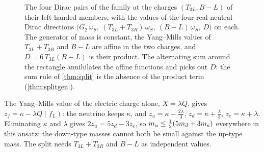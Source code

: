 \begin{figure}[t]
\centering
{}
\caption{The four Dirac pairs of the family at the charges $(T_{3L},B\!-\!L)$ of their left-handed members, with the values of the four real
neutral Dirac directions $\bigl(G_2\,\omega_S,\ (T_{3L}+T_{3R})\,\omega_S,\ (B\!-\!L)\,\omega_S,\ D\bigr)$ on each. The generator of mass is
constant, the Yang--Mills values of $T_{3L}+T_{3R}$ and $B\!-\!L$ are affine in the two charges, and $D=6\,T_{3L}(B\!-\!L)$ is their product.
The alternating sum around the rectangle annihilates the affine functions and picks out $D$: the sum rule of \cref{thm:split} is the absence
of the product term (\cref{thm:splitgen}).}
\label{fig:diracpairs}
\end{figure}

\begin{remark}
The Yang--Mills value of the electric charge alone, $X=\lambda Q$, gives $z_f=\kappa-\lambda Q(f_L)$: the neutrino keeps $\kappa$, and
$z_u=\kappa-\tfrac{2\lambda}3$, $z_d=\kappa+\tfrac\lambda3$, $z_e=\kappa+\lambda$. Eliminating $\kappa$ and $\lambda$ gives
$2z_u=5z_d-3z_e$, so $m_u\le\tfrac12(5m_d+3m_e)$ everywhere in this ansatz: the down-type masses cannot both be small against the up-type mass.
The split needs $T_{3L}+T_{3R}$ and $B\!-\!L$ as independent values.
\end{remark}

